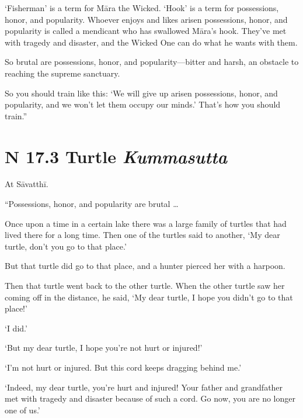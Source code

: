 \documentclass[12pt,openany]{book}%
\newcommand*{\suttatitleacronym}[1]{\smaller[2]{#1}\vspace*{.3em}}
\newcommand*{\suttatitletranslation}[1]{\linebreak{#1}}
\newcommand*{\suttatitleroot}[1]{\linebreak\smaller[2]\itshape{#1}}
\newcommand*{\tocacronym}[1]{\hspace*{-3.3em}{#1}\quad}
\newcommand*{\toctranslation}[1]{#1}
\newcommand*{\tocroot}[1]{(\textit{#1})}
\begin{document}
‘Fisherman’ is a term for \textsanskrit{Māra} the Wicked. ‘Hook’ is a term for possessions, honor, and popularity. Whoever enjoys and likes arisen possessions, honor, and popularity is called a mendicant who has swallowed \textsanskrit{Māra}’s hook. They’ve met with tragedy and disaster, and the Wicked One can do what he wants with them. 

So brutal are possessions, honor, and popularity—bitter and harsh, an obstacle to reaching the supreme sanctuary. 

So you should train like this: ‘We will give up arisen possessions, honor, and popularity, and we won’t let them occupy our minds.’ That’s how you should train.” 

%
\section*{{\suttatitleacronym SN 17.3}{\suttatitletranslation A Turtle }{\suttatitleroot Kummasutta}}
\addcontentsline{toc}{section}{\tocacronym{SN 17.3} \toctranslation{A Turtle } \tocroot{Kummasutta}}

At \textsanskrit{Sāvatthī}. 

“Possessions, honor, and popularity are brutal … 

Once upon a time in a certain lake there was a large family of turtles that had lived there for a long time. Then one of the turtles said to another, ‘My dear turtle, don’t you go to that place.’ 

But that turtle did go to that place, and a hunter pierced her with a harpoon. 

Then that turtle went back to the other turtle. When the other turtle saw her coming off in the distance, he said, ‘My dear turtle, I hope you didn’t go to that place!’ 

‘I did.’ 

‘But my dear turtle, I hope you’re not hurt or injured!’ 

‘I’m not hurt or injured. But this cord keeps dragging behind me.’ 

‘Indeed, my dear turtle, you’re hurt and injured! Your father and grandfather met with tragedy and disaster because of such a cord. Go now, you are no longer one of us.’ 
\end{document}
